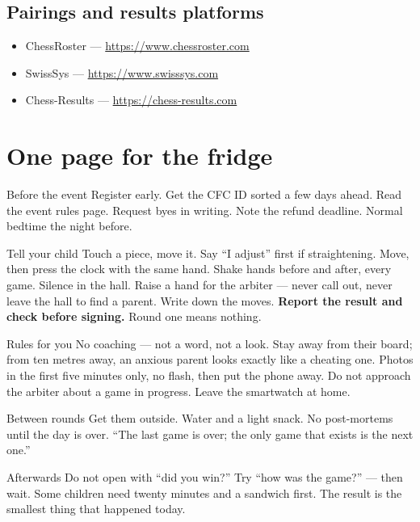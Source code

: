 \documentclass[10pt,letterpaper]{article}
\begin{document}
\subsection*{Pairings and results platforms}
\begin{itemize}
  \item ChessRoster --- \url{https://www.chessroster.com}
  \item SwissSys --- \url{https://www.swisssys.com}
  \item Chess-Results --- \url{https://chess-results.com}
\end{itemize}

\newpage
\section{One page for the fridge}
\label{app:fridge}

\begin{keybox}{Before the event}
Register early. Get the CFC ID sorted a few days ahead. Read the event rules page.
Request byes in writing. Note the refund deadline. Normal bedtime the night
before.
\end{keybox}

\begin{keybox}{Tell your child}
Touch a piece, move it. Say ``I adjust'' first if straightening. Move, then press
the clock with the same hand. Shake hands before and after, every game. Silence
in the hall. Raise a hand for the arbiter --- never call out, never leave the
hall to find a parent. Write down the moves. \textbf{Report the result and check
before signing.} Round one means nothing.
\end{keybox}

\begin{keybox}{Rules for you}
No coaching --- not a word, not a look. Stay away from their board; from ten
metres away, an anxious parent looks exactly like a cheating one. Photos in the
first five minutes only, no flash, then put the phone away. Do not approach the
arbiter about a game in progress. Leave the smartwatch at home.
\end{keybox}

\begin{keybox}{Between rounds}
Get them outside. Water and a light snack. No post-mortems until the day is
over. ``The last game is over; the only game that exists is the next one.''
\end{keybox}

\begin{keybox}{Afterwards}
Do not open with ``did you win?'' Try ``how was the game?'' --- then wait.
Some children need twenty minutes and a sandwich first. The result is the
smallest thing that happened today.
\end{keybox}
\end{document}
